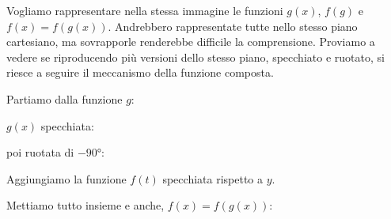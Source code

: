Vogliamo rappresentare nella stessa immagine le funzioni 
\(g(x)\), \(f(g)\) e \(f(x) = f(g(x))\).
Andrebbero rappresentate tutte nello stesso piano cartesiano, ma 
sovrapporle renderebbe difficile la comprensione. 
Proviamo a vedere se riproducendo più versioni dello stesso piano, 
specchiato e ruotato, si riesce a seguire il meccanismo della funzione 
composta.

\noindent\begin{minipage}{.32\textwidth}
\begin{center}
Partiamo dalla funzione \(g\):

\end{center}
\end{minipage}
\begin{minipage}{.32\textwidth}
\begin{center}
\(g(x)\) specchiata:

\disegno[5]{
  \begin{scope}[yscale=-1, red!50!black] \funzioneg \end{scope}
}
\end{center}
\end{minipage}
\begin{minipage}{.32\textwidth}
\begin{center}
poi ruotata di \(-90\text{°}\):

\disegno[5]{
  \begin{scope}[rotate=-90, yscale=-1, red!50!black]
    \funzioneg
  \end{scope}
}
\end{center}
\end{minipage}

\noindent\begin{minipage}{.32\textwidth}
\begin{center}
Aggiungiamo la funzione \(f(t)\) specchiata rispetto a \(y\).

\disegno[5]{
  \begin{scope}[rotate=-90, yscale=-1, red!50!black]
    \funzioneg
  \end{scope}
  \begin{scope}[xscale=-1, blue!50!black]
    \funzioneh
  \end{scope}
}
\end{center}
\end{minipage}
\begin{minipage}{.65\textwidth}
\begin{center}
Mettiamo tutto insieme e anche, \(f(x) = f(g(x))\): \\[.5em]

\derivatacomposta
\end{center}
\end{minipage}


